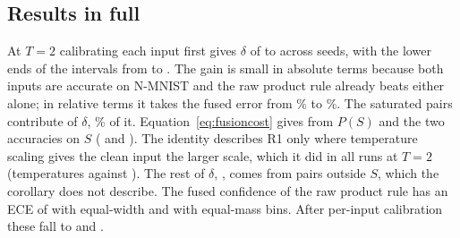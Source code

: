 \subsection{Results in full}
\label{app:fusionresults}

At $T=2$ calibrating each input first gives $\delta$ of \fuTwoDeltaMin{} to \fuTwoDeltaMax{} %
across seeds, with the lower ends of the intervals from \fuTwoCiLowMin{} to \fuTwoCiLowMax. The gain is %
small in absolute terms because both inputs are accurate on N-MNIST and the raw product rule
already beats either alone; in relative terms it takes the fused error from \fuTwoErrZero\% to %
\fuTwoErrOne\%. The saturated pairs contribute \fuCountTwoDeltaOnS{} of $\delta$, %
\fuTwoShareOnS\% of it. Equation~\eqref{eq:fusioncost} gives \fuCountTwoPredicted{} from $P(S)$ %
and the two accuracies on $S$ (\fuTwoAccAOnS{} and \fuTwoAccBOnS). The identity describes R1 %
only where temperature scaling gives the clean input the larger scale, which it did in all
\fuTwoScaleOrderRuns{} runs at $T=2$ (temperatures \fuTwoTempA{} against \fuTwoTempB). The rest %
of $\delta$, \fuTwoDeltaOffS, comes from pairs outside $S$, which the corollary does not %
describe. The fused confidence of the raw product rule has an ECE of \fuTwoEceRZeroW{} with
equal-width and \fuTwoEceRZeroM{} with equal-mass bins. After per-input calibration these fall %
to \fuTwoEceROneW{} and \fuTwoEceROneM. %


